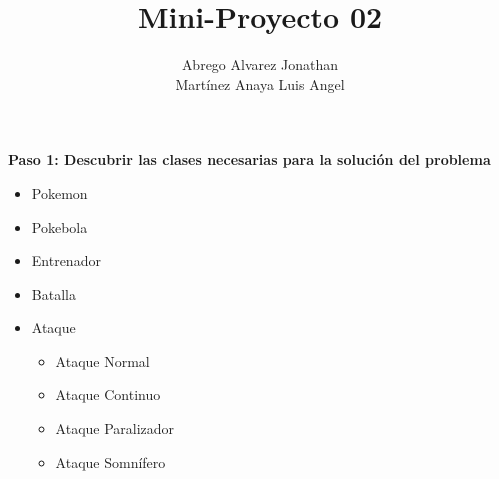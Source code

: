 \documentclass[a4paper,11pt]{report}
\title{\textbf{Mini-Proyecto 02}}
\author{Abrego Alvarez Jonathan \\ Martínez Anaya Luis Angel}
\begin{document}

\textbf{Paso 1: Descubrir las clases necesarias para la solución del problema \\}
\begin{itemize}
\item Pokemon
\item Pokebola
\item Entrenador
\item Batalla
\item Ataque
\begin{itemize}
\item Ataque Normal
\item Ataque Continuo
\item Ataque Paralizador
\item Ataque Somnífero
\end{itemize}
\end{itemize}
\end{document}
